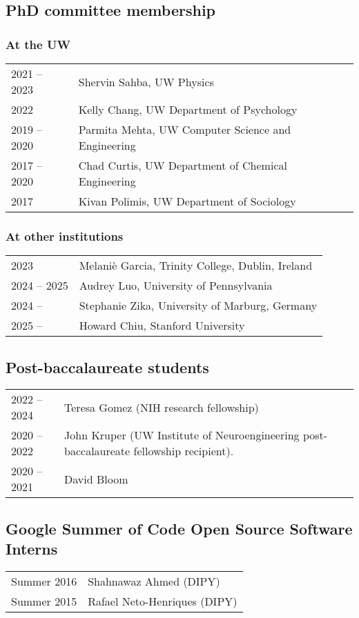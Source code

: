 \documentclass[11pt,fullpage]{article}
\begin{document}
\subsection*{PhD committee membership}

\subsubsection*{At the UW}
\begin{tabular}{p{}p{}}
2021 -- 2023 & Shervin Sahba, UW Physics \\
2022 & Kelly Chang, UW Department of Psychology\\
2019 -- 2020 & Parmita Mehta, UW Computer Science and Engineering\\
2017 -- 2020 & Chad Curtis, UW Department of Chemical Engineering\\
2017 & Kivan Polimis, UW Department of Sociology
\end{tabular}
\subsubsection*{At other institutions}
\begin{tabular}{p{}p{}}
2023 & Melani\`{e} Garcia, Trinity College, Dublin, Ireland\\
2024 -- 2025 & Audrey Luo, University of Pennsylvania\\
2024 -- & Stephanie Zika, University of Marburg, Germany\\
2025 -- & Howard Chiu, Stanford University \\
\end{tabular}

\subsection*{Post-baccalaureate students}
\begin{tabular}{p{}p{}}
2022 -- 2024 & Teresa Gomez (NIH research fellowship) \\
2020 -- 2022 & John Kruper (UW Institute of Neuroengineering post-baccalaureate fellowship recipient).\\
2020 -- 2021 & David Bloom\\
\end{tabular}

\subsection*{Google Summer of Code Open Source Software Interns}
\begin{tabular}{p{}p{}}
Summer 2016 & Shahnawaz Ahmed (DIPY)\\
Summer 2015 & Rafael Neto-Henriques (DIPY)\\
\end{tabular}
\end{document}
